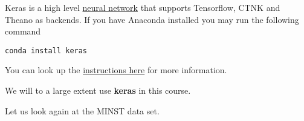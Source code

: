 Keras is a high level \href{{https://en.wikipedia.org/wiki/Application_programming_interface}}{neural network}
that supports Tensorflow, CTNK and Theano as backends.  
If you have Anaconda installed you may run the following command


\begin{verbatim}
conda install keras

\end{verbatim}

You can look up the \href{{https://keras.io/}}{instructions here} for more information.

We will to a large extent use \textbf{keras} in this course. 

Let us look again at the MINST data set.













































